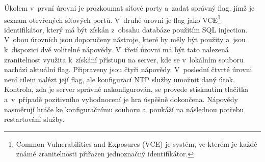 \documentclass[
  digital, %
  oneside, %
  table,   %
  nolof,     %
  nolot,     %
]{fithesis3}
\begin{document}
Úkolem v~první úrovni je prozkoumat síťové porty a~zadat správný flag, jímž je seznam otevřených síťových portů. V~druhé úrovni je flag jako VCE\footnote{Common Vulnerabilities and Exposures (VCE) je systém, ve kterém je každé známé zranitelnosti přiřazen jednoznačný identifikátor.} identifikátor, který má být získán z~obsahu databáze použitím SQL injection. V~obou úrovních jsou doporučeny nástroje, které by měly být použity a~jsou k~dispozici dvě volitelné nápovědy. V~třetí úrovni má být tato nalezená zranitelnost využita k~získání přístupu na server, kde se v~lokálním souboru nachází aktuální flag. Připraveny jsou čtyři nápovědy. V~poslední čtvrté úrovni není cílem nalézt její flag, ale konfigurací NTP služby umožnit daný útok. Kontrola, zda je server správně nakonfigurován, se provede stisknutím tlačítka a~v~případě pozitivního vyhodnocení je hra úspěšně dokončena. Nápovědy nasměrují hráče ke konfiguračnímu souboru a~poukáží na následnou potřebu restartování služby.
\end{document}

